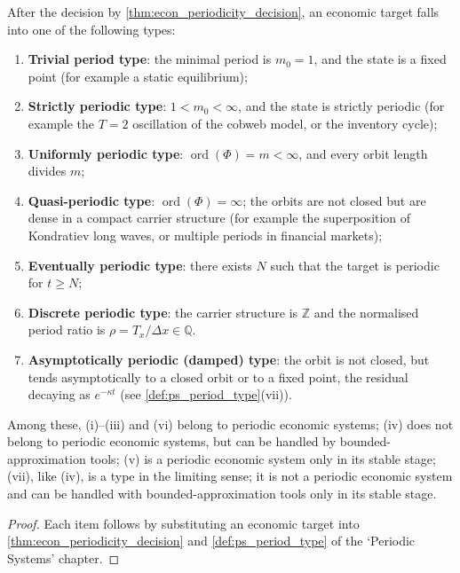 \begin{corollary}\label{cor:econ_period_type}
After the decision by \cref{thm:econ_periodicity_decision}, an economic target falls into one of the following types:
\begin{enumerate}[label=(\roman*)]
    \item \textbf{Trivial period type}: the minimal period is $m_0=1$, and the state is a fixed point (for example a static equilibrium);
    \item \textbf{Strictly periodic type}: $1<m_0<\infty$, and the state is strictly periodic (for example the $T=2$ oscillation of the cobweb model, or the inventory cycle);
    \item \textbf{Uniformly periodic type}: $\operatorname{ord}(\Phi)=m<\infty$, and every orbit length divides $m$;
    \item \textbf{Quasi-periodic type}: $\operatorname{ord}(\Phi)=\infty$; the orbits are not closed but are dense in a compact carrier structure (for example the superposition of Kondratiev long waves, or multiple periods in financial markets);
    \item \textbf{Eventually periodic type}: there exists $N$ such that the target is periodic for $t\ge N$;
    \item \textbf{Discrete periodic type}: the carrier structure is $\mathbb Z$ and the normalised period ratio is $\rho=T_x/\Delta x\in\mathbb Q$.
    \item \textbf{Asymptotically periodic (damped) type}: the orbit is not closed, but tends asymptotically to a closed orbit or to a fixed point, the residual decaying as $e^{-\kappa t}$ (see \cref{def:ps_period_type}(vii)).
\end{enumerate}
Among these, (i)--(iii) and (vi) belong to periodic economic systems; (iv) does not belong to periodic economic systems, but can be handled by bounded-approximation tools; (v) is a periodic economic system only in its stable stage; (vii), like (iv), is a type in the limiting sense; it is not a periodic economic system and can be handled with bounded-approximation tools only in its stable stage.
\end{corollary}

\begin{proof}
Each item follows by substituting an economic target into \cref{thm:econ_periodicity_decision} and \cref{def:ps_period_type} of the `Periodic Systems' chapter.
\end{proof}

